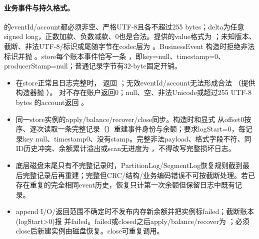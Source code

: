 \paragraph{业务事件与持久格式。} 的eventId/account都必须非空、严格UTF-8且各不超过255 bytes；delta为任意signed long，正数加款、负数减款、0也是合法。提供的value格式为 ；未知版本、截断、非法UTF-8/标识或尾随字节在codec层为 。BusinessEvent 构造时拒绝非法标识并抛 。store每个账本事件恰写一条 ，即key=null、timestamp=0、producerStamp=null；普通记录字节有32-byte固定开销。
\begin{itemize}
\item 在store正常且日志完整时， 返回 ；无效eventId/account无法形成合法 （提供构造器抛 ）。 对不存在账户返回0；null、空、非法Unicode或超过255 UTF-8 bytes 的account返回 。
\item 同一store实例的apply/balance/recover/close同步。构造时和显式  从offset0按序、逐次读取一条完整记录（）重建事件身份与余额；要求logStart=0，每记录key null、timestamp0、没有stamp。完整非法payload、格式字段不符、同ID历史冲突、余额累计溢出或scan无进度为 ，不得改写完整损坏日志。
\item 底层磁盘末尾只有不完整记录时，PartitionLog/SegmentLog恢复规则截到最后完整记录后再重建；完整但CRC/结构/业务编码错误不可按截断处理。若已存在重复的完全相同event历史，恢复只计第一次余额但保留日志中既有记录。
\item append I/O/返回范围不确定时不发布内存新余额并把实例标failed；截断账本(logStart>0)报  并failed。failed或closed之后apply/balance/recover为 ；必须close后新建实例由磁盘恢复。close可重复调用。
\end{itemize}
